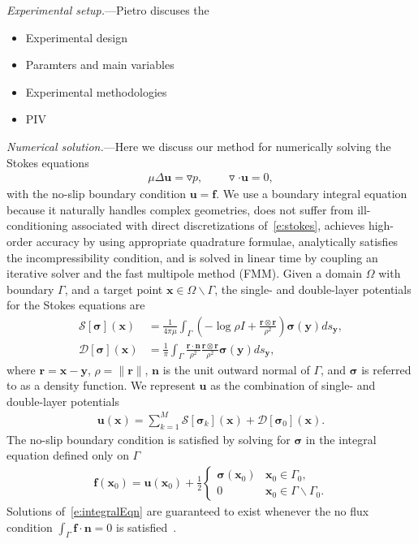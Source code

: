 \documentclass[twocolumn,showpacs,pre,preprintnumbers,floatfix]{revtex4-1}
\newcommand{\ff}{{\mathbf{f}}}
\newcommand{\nn}{{\mathbf{n}}}
\newcommand{\rr}{{\mathbf{r}}}
\newcommand{\ssigma}{{\boldsymbol{\sigma}}}
\newcommand{\uu}{{\mathbf{u}}}
\newcommand{\xx}{{\mathbf{x}}}
\newcommand{\yy}{{\mathbf{y}}}
\newcommand{\grad}{{\triangledown}}
\renewcommand{\SS}{{\mathcal{S}}}
\newcommand{\DD}{{\mathcal{D}}}
\begin{document}
{\em Experimental setup.}---Pietro discuses the
\begin{itemize}
  \item Experimental design
  \item Paramters and main variables
  \item Experimental methodologies
  \item PIV
\end{itemize}

{\em Numerical solution.}---Here we discuss our method for numerically
solving the Stokes equations
\begin{align}
  \mu \Delta \uu  = \grad p, \qquad \grad \cdot \uu = 0,
  \label{e:stokes}
\end{align}
with the no-slip boundary condition $\uu = \ff$.  We use a boundary
integral equation because it naturally handles complex geometries, does
not suffer from ill-conditioning associated with direct discretizations
of~\eqref{e:stokes}, achieves high-order accuracy by using appropriate
quadrature formulae, analytically satisfies the incompressibility
condition, and is solved in linear time by coupling an iterative solver
and the fast multipole method (FMM).  Given a domain $\Omega$ with
boundary $\Gamma$, and a target point $\xx \in \Omega \backslash
\Gamma$, the single- and double-layer potentials for the Stokes
equations are~\cite{poz1992}
\begin{align*}
  \SS[\ssigma](\xx) &= \frac{1}{4\pi\mu}\int_{\Gamma} \left(
  -\log\rho I + \frac{\rr \otimes\rr}{\rho^{2}} 
  \right)\ssigma(\yy)ds_{\yy},  \\
  \DD[\ssigma](\xx) &= \frac{1}{\pi}\int_{\Gamma} 
  \frac{\rr \cdot \nn}{\rho^{2}}\frac{\rr \otimes \rr}{\rho^{2}}
  \ssigma(\yy)ds_{\yy},
\end{align*}
where $\rr = \xx - \yy$, $\rho = \|\rr\|$, $\nn$ is the unit outward
normal of $\Gamma$, and $\ssigma$ is referred to as a density
function.  We represent $\uu$ as the combination of single- and
double-layer potentials
\begin{align}
  \uu(\xx) = \sum_{k=1}^{M} \SS[\ssigma_{k}](\xx) + 
    \DD[\ssigma_{0}](\xx).
  \label{e:integralRep}
\end{align}
The no-slip boundary condition is satisfied by solving for $\ssigma$ in
the integral equation defined only on $\Gamma$
\begin{align}
  \ff(\xx_{0}) = \uu(\xx_{0}) + \frac{1}{2}\left\{
    \begin{array}{cl}
      \ssigma(\xx_{0}) & \xx_{0} \in \Gamma_{0}, \\
      0 & \xx_{0} \in \Gamma \backslash \Gamma_{0}.
    \end{array}
    \right. 
    \label{e:integralEqn}
\end{align}
Solutions of~\eqref{e:integralEqn} are guaranteed to exist whenever the
no flux condition $\int_{\Gamma} \ff \cdot \nn=0$ is
satisfied~\cite{poz1992}.
\end{document}
